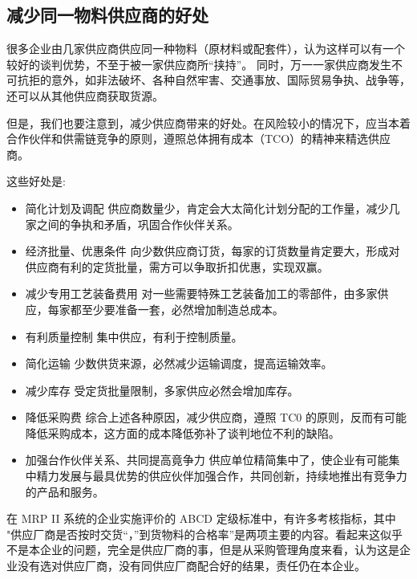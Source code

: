 \subsection {减少同一物料供应商的好处}

    很多企业由几家供应商供应同一种物料（原材料或配套件），认为这样可以有一个较好的谈判优势，不至于被一家供应商所“挟持”。 同时，万一一家供应商发生不可抗拒的意外，如非法破坏、各种自然牢害、交通事放、国际贸易争执、战争等，还可以从其他供应商获取货源。

    但是，我们也要注意到，减少供应商带来的好处。在风险较小的情况下，应当本着合作伙伴和供需链竞争的原则，遵照总体拥有成本（TCO）的精神来精选供应商。

    这些好处是:
    \begin{itemize}
        \item 简化计划及调配 供应商数量少，肯定会大太简化计划分配的工作量，减少几家之间的争执和矛盾，巩固合作伙伴关系。

        \item 经济批量、优惠条件 向少数供应商订货，每家的订货数量肯定要大，形成对供应商有利的定货批量，需方可以争取折扣优惠，实现双赢。

        \item 减少专用工艺装备费用 对一些需要特殊工艺装备加工的零部件，由多家供应，每家都至少要准备一套，必然增加制造总成本。

        \item 有利质量控制 集中供应，有利于控制质量。

        \item 简化运输 少数供货来源，必然减少运输调度，提高运输效率。

        \item 减少库存 受定货批量限制，多家供应必然会增加库存。

        \item 降低采购费 综合上述各种原因，减少供应商，遵照 TC0 的原则，反而有可能降低采购成本，这方面的成本降低弥补了谈判地位不利的缺陷。

        \item 加强台作伙伴关系、共同提高竟争力 供应单位精简集中了，使企业有可能集中精力发展与最具优势的供应伙伴加强合作，共同创新，持续地推出有竞争力的产品和服务。

    \end{itemize}

    在 MRP II 系统的企业实施评价的 ABCD 定级标准中，有许多考核指标，其中 "供应厂商是否按时交货“，”到货物料的合格率”是两项主要的内容。看起来这似乎不是本企业的问题，完全是供应厂商的事，但是从采购管理角度来看，认为这是企业没有选对供应厂商，没有同供应厂商配合好的结果，责任仍在本企业。

